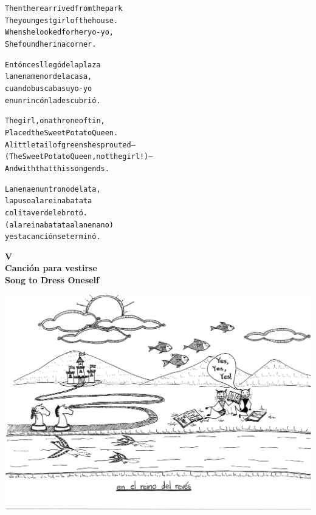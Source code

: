 \documentclass[11pt]{article}
\begin{document}
\begin{parcolumns}{2}
\colchunk
{
\begin{alltt}\normalfont
Then there arrived from the park
The youngest girl of the house.
When she looked for her yo-yo,
She found her in a corner.
\end{alltt}
}

\colchunk
{
\begin{alltt}\normalfont
Entónces llegó de la plaza
la nena menor de la casa,
cuando buscaba su yo-yo
en un rincón la descubrió.
\end{alltt}
}

\colplacechunks

\colchunk
{
\begin{alltt}\normalfont
The girl, on a throne of tin,
Placed the Sweet Potato Queen.
A little tail of green she sprouted –
(The Sweet Potato Queen, not the girl!) –
And with that this song ends.
\end{alltt}
}

\colchunk
{
\begin{alltt}\normalfont
La nena en un trono de lata,
la puso a la reina batata
colita verde le brotó.
(a la reina batata a la nena no)
y esta canción se terminó.
\end{alltt}
}

\colplacechunks

\end{parcolumns}

\clearpage

\begin{center}
\large\textbf{
V\\
Canción para vestirse\\
Song to Dress Oneself
}
\end{center}

\begin{center}
\includegraphics[page=5,scale=0.5,clip=true,trim = 0in 3mm 0in 0in]{20150406235752619.pdf}

\end{center}
\end{document}
